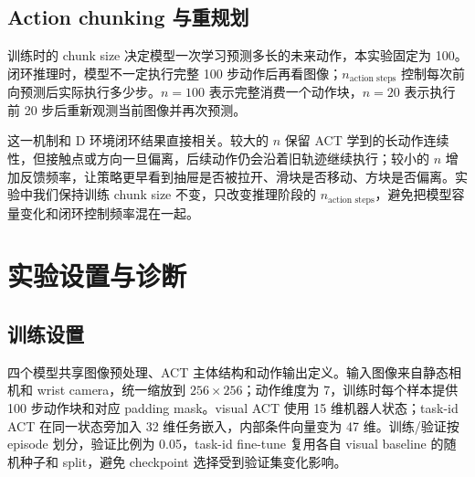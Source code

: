 \documentclass[11pt,a4paper,fontset=fandol]{ctexart}
\begin{document}
\subsection{Action chunking 与重规划}

训练时的 chunk size 决定模型一次学习预测多长的未来动作，本实验固定为 100。闭环推理时，模型不一定执行完整 100 步动作后再看图像；$n_\text{action steps}$ 控制每次前向预测后实际执行多少步。$n=100$ 表示完整消费一个动作块，$n=20$ 表示执行前 20 步后重新观测当前图像并再次预测。

这一机制和 D 环境闭环结果直接相关。较大的 $n$ 保留 ACT 学到的长动作连续性，但接触点或方向一旦偏离，后续动作仍会沿着旧轨迹继续执行；较小的 $n$ 增加反馈频率，让策略更早看到抽屉是否被拉开、滑块是否移动、方块是否偏离。实验中我们保持训练 chunk size 不变，只改变推理阶段的 $n_\text{action steps}$，避免把模型容量变化和闭环控制频率混在一起。

\section{实验设置与诊断}

\subsection{训练设置}

四个模型共享图像预处理、ACT 主体结构和动作输出定义。输入图像来自静态相机和 wrist camera，统一缩放到 $256\times256$；动作维度为 7，训练时每个样本提供 100 步动作块和对应 padding mask。visual ACT 使用 15 维机器人状态；task-id ACT 在同一状态旁加入 32 维任务嵌入，内部条件向量变为 47 维。训练/验证按 episode 划分，验证比例为 0.05，task-id fine-tune 复用各自 visual baseline 的随机种子和 split，避免 checkpoint 选择受到验证集变化影响。
\end{document}
